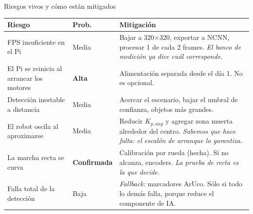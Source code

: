 \documentclass[aspectratio=169,10pt]{beamer}
\begin{document}
\begin{frame}{Riesgos vivos y cómo están mitigados}
  \scriptsize
  \begin{table}
    \begin{tabular}{@{}p{4.3cm}p{1.6cm}p{6.3cm}@{}}
      \toprule
      \textbf{Riesgo} & \textbf{Prob.} & \textbf{Mitigación} \\
      \midrule
      FPS insuficiente en el Pi & Media &
        Bajar a 320$\times$320, exportar a NCNN, procesar 1 de cada 2 frames.
        \emph{El banco de medición ya dice cuál corresponde.} \\
      El Pi se reinicia al arrancar los motores & \textbf{Alta} &
        Alimentación separada desde el día 1. No es opcional. \\
      Detección inestable a distancia & Media &
        Acercar el escenario, bajar el umbral de confianza, objetos más grandes. \\
      El robot oscila al aproximarse & Media &
        Reducir $K_{p,ang}$ y agregar zona muerta alrededor del centro.
        \emph{Sabemos que hace falta: el escalón de arranque lo garantiza.} \\
      La marcha recta se curva & \textbf{Confirmada} &
        Calibración por rueda (hecha). Si no alcanza, encoders. \emph{La prueba
        de recta es la que decide.} \\
      Falla total de la detección & Baja &
        \emph{Fallback:} marcadores ArUco. Sólo si todo lo demás falla, porque
        reduce el componente de IA. \\
      \bottomrule
    \end{tabular}
  \end{table}
\end{frame}
\end{document}

